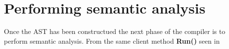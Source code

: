 \section{Performing semantic analysis}

Once the AST has been constructued the next phase of the compiler is to perform semantic analysis. From the same client method \textbf{Run()} seen in 